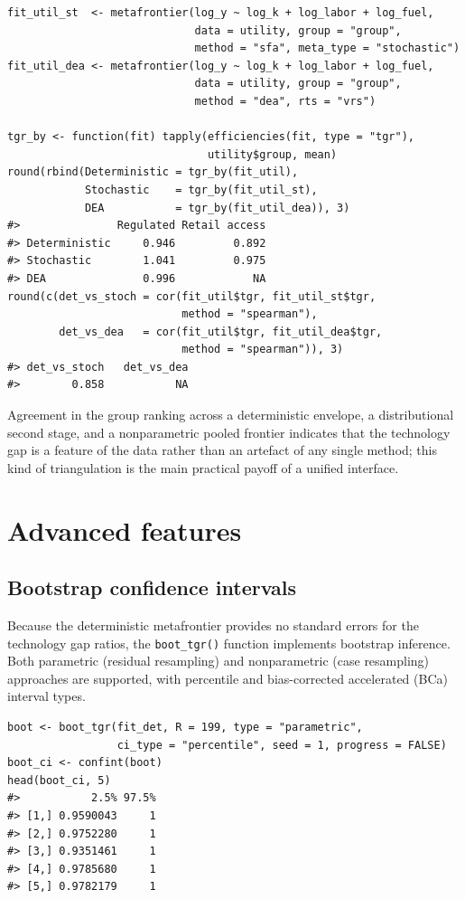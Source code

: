\begin{verbatim}
fit_util_st  <- metafrontier(log_y ~ log_k + log_labor + log_fuel,
                             data = utility, group = "group",
                             method = "sfa", meta_type = "stochastic")
fit_util_dea <- metafrontier(log_y ~ log_k + log_labor + log_fuel,
                             data = utility, group = "group",
                             method = "dea", rts = "vrs")

tgr_by <- function(fit) tapply(efficiencies(fit, type = "tgr"),
                               utility$group, mean)
round(rbind(Deterministic = tgr_by(fit_util),
            Stochastic    = tgr_by(fit_util_st),
            DEA           = tgr_by(fit_util_dea)), 3)
#>               Regulated Retail access
#> Deterministic     0.946         0.892
#> Stochastic        1.041         0.975
#> DEA               0.996            NA
round(c(det_vs_stoch = cor(fit_util$tgr, fit_util_st$tgr,
                           method = "spearman"),
        det_vs_dea   = cor(fit_util$tgr, fit_util_dea$tgr,
                           method = "spearman")), 3)
#> det_vs_stoch   det_vs_dea 
#>        0.858           NA
\end{verbatim}

Agreement in the group ranking across a deterministic envelope, a
distributional second stage, and a nonparametric pooled frontier indicates
that the technology gap is a feature of the data rather than an artefact
of any single method; this kind of triangulation is the main practical
payoff of a unified interface.

\section{Advanced features}\label{sec:advanced-features}

\subsection{Bootstrap confidence intervals}\label{sec:bootstrap-ci}

Because the deterministic metafrontier provides no standard errors for the
technology gap ratios, the \texttt{boot\_tgr()} function implements bootstrap inference.
Both parametric (residual resampling) and nonparametric (case resampling)
approaches are supported, with percentile and bias-corrected accelerated (BCa)
interval types.

\begin{verbatim}
boot <- boot_tgr(fit_det, R = 199, type = "parametric",
                 ci_type = "percentile", seed = 1, progress = FALSE)
boot_ci <- confint(boot)
head(boot_ci, 5)
#>           2.5% 97.5%
#> [1,] 0.9590043     1
#> [2,] 0.9752280     1
#> [3,] 0.9351461     1
#> [4,] 0.9785680     1
#> [5,] 0.9782179     1
\end{verbatim}


